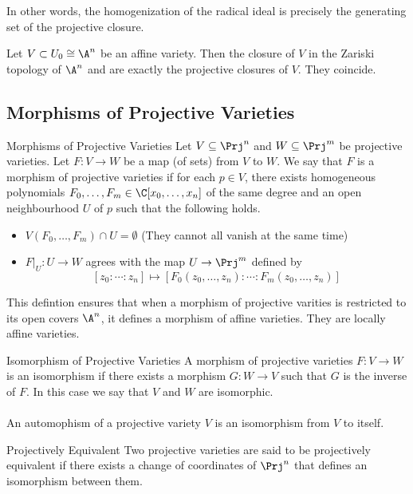 \documentclass[a4paper]{article}
\begin{document}
In other words, the homogenization of the radical ideal is precisely the generating set of the projective closure. 


\begin{prp}{}{} Let $V\subset U_0\cong\A^n$ be an affine variety. Then the closure of $V$ in the Zariski topology of $\A^n$ and are exactly the projective closures of $V$. They coincide. 
\end{prp}

\subsection{Morphisms of Projective Varieties}
\begin{defn}{Morphisms of Projective Varieties}{} Let $V\subseteq\Prj^n$ and $W\subseteq\Prj^m$ be projective varieties. Let $F:V\to W$ be a map (of sets) from $V$ to $W$. We say that $F$ is a morphism of projective varieties if for each $p\in V$, there exists homogeneous polynomials $F_0,\dots,F_m\in\C[x_0,\dots,x_n]$ of the same degree and an open neighbourhood $U$ of $p$ such that the following holds. 
\begin{itemize}
\item $V(F_0,\dots,F_m)\cap U=\emptyset$ (They cannot all vanish at the same time)
\item $F|_U:U\to W$ agrees with the map $U\to\Prj^m$ defined by $$[z_0:\cdots:z_n]\mapsto[F_0(z_0,\dots,z_n):\cdots:F_m(z_0,\dots,z_n)]$$
\end{itemize}
\end{defn}

This defintion ensures that when a morphism of projective varities is restricted to its open covers $\A^n$, it defines a morphism of affine varieties. They are locally affine varieties. 

\begin{defn}{Isomorphism of Projective Varieties}{} A morphism of projective varieties $F:V\to W$ is an isomorphism if there exists a morphism $G:W\to V$ such that $G$ is the inverse of $F$. In this case we say that $V$ and $W$ are isomorphic. \\~\\
An automophism of a projective variety $V$ is an isomorphism from $V$ to itself. 
\end{defn}

\begin{defn}{Projectively Equivalent}{} Two projective varieties are said to be projectively equivalent if there exists a change of coordinates of $\Prj^n$ that defines an isomorphism between them. 
\end{defn}
\end{document}
